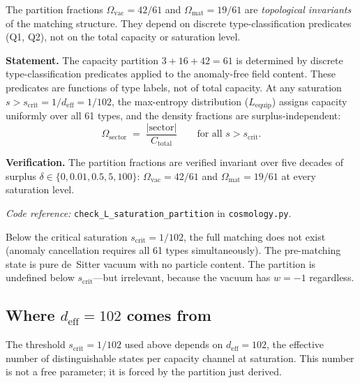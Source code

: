 \documentclass[11pt]{article}
\newcommand{\coderef}[2]{\smallskip\noindent\textit{Code reference:} \texttt{#1} in \texttt{#2}.}
\begin{document}
The partition fractions $\Omega_{\mathrm{vac}} = 42/61$ and $\Omega_{\mathrm{mat}} = 19/61$ are \emph{topological invariants} of the matching structure.  They depend on discrete type-classification predicates (Q1, Q2), not on the total capacity or saturation level.

\begin{tcolorbox}[apfbox, title={$L_{\mathrm{sat,part}}$ (Saturation-Independent Partition)}]
\textbf{Statement.}  The capacity partition $3 + 16 + 42 = 61$ is determined by discrete type-classification predicates applied to the anomaly-free field content.  These predicates are functions of type labels, not of total capacity.  At any saturation $s > s_{\mathrm{crit}} = 1/d_{\mathrm{eff}} = 1/102$, the max-entropy distribution ($L_{\mathrm{equip}}$) assigns capacity uniformly over all 61 types, and the density fractions are surplus-independent:
\begin{equation}
\Omega_{\mathrm{sector}} \;=\; \frac{|\mathrm{sector}|}{C_{\mathrm{total}}} \qquad \text{for all } s > s_{\mathrm{crit}}.
\label{eq:omega_sector}
\end{equation}

\smallskip\noindent\textbf{Verification.}  The partition fractions are verified invariant over five decades of surplus $\delta \in \{0, 0.01, 0.5, 5, 100\}$: $\Omega_{\mathrm{vac}} = 42/61$ and $\Omega_{\mathrm{mat}} = 19/61$ at every saturation level.

\coderef{check\_L\_saturation\_partition}{cosmology.py}
\end{tcolorbox}

Below the critical saturation $s_{\mathrm{crit}} = 1/102$, the full matching does not exist (anomaly cancellation requires all 61 types simultaneously).  The pre-matching state is pure de~Sitter vacuum with no particle content.  The partition is undefined below $s_{\mathrm{crit}}$---but irrelevant, because the vacuum has $w = -1$ regardless.


\subsection{Where \texorpdfstring{$d_{\mathrm{eff}} = 102$}{deff = 102} comes from}
\label{sec:deff}

The threshold $s_{\mathrm{crit}} = 1/102$ used above depends on $d_{\mathrm{eff}} = 102$, the effective number of distinguishable states per capacity channel at saturation.  This number is not a free parameter; it is forced by the partition just derived.
\end{document}
